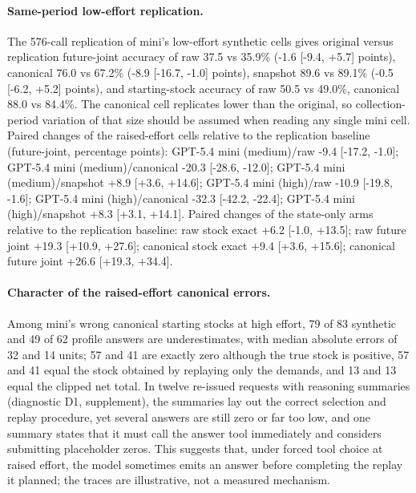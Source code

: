\paragraph{Same-period low-effort replication.} The 576-call replication of mini's low-effort synthetic cells gives original versus replication future-joint accuracy of raw 37.5 vs 35.9\% (-1.6 [-9.4, +5.7] points), canonical 76.0 vs 67.2\% (-8.9 [-16.7, -1.0] points), snapshot 89.6 vs 89.1\% (-0.5 [-6.2, +5.2] points), and starting-stock accuracy of raw 50.5 vs 49.0\%, canonical 88.0 vs 84.4\%. The canonical cell replicates lower than the original, so collection-period variation of that size should be assumed when reading any single mini cell. Paired changes of the raised-effort cells relative to the replication baseline (future-joint, percentage points): GPT-5.4 mini (medium)/raw -9.4 [-17.2, -1.0]; GPT-5.4 mini (medium)/canonical -20.3 [-28.6, -12.0]; GPT-5.4 mini (medium)/snapshot +8.9 [+3.6, +14.6]; GPT-5.4 mini (high)/raw -10.9 [-19.8, -1.6]; GPT-5.4 mini (high)/canonical -32.3 [-42.2, -22.4]; GPT-5.4 mini (high)/snapshot +8.3 [+3.1, +14.1]. Paired changes of the state-only arms relative to the replication baseline: raw stock exact +6.2 [-1.0, +13.5]; raw future joint +19.3 [+10.9, +27.6]; canonical stock exact +9.4 [+3.6, +15.6]; canonical future joint +26.6 [+19.3, +34.4].

\paragraph{Character of the raised-effort canonical errors.} Among mini's wrong canonical starting stocks at high effort, 79 of 83 synthetic and 49 of 62 profile answers are underestimates, with median absolute errors of 32 and 14 units; 57 and 41 are exactly zero although the true stock is positive, 57 and 41 equal the stock obtained by replaying only the demands, and 13 and 13 equal the clipped net total. In twelve re-issued requests with reasoning summaries (diagnostic D1, supplement), the summaries lay out the correct selection and replay procedure, yet several answers are still zero or far too low, and one summary states that it must call the answer tool immediately and considers submitting placeholder zeros. This suggests that, under forced tool choice at raised effort, the model sometimes emits an answer before completing the replay it planned; the traces are illustrative, not a measured mechanism.

